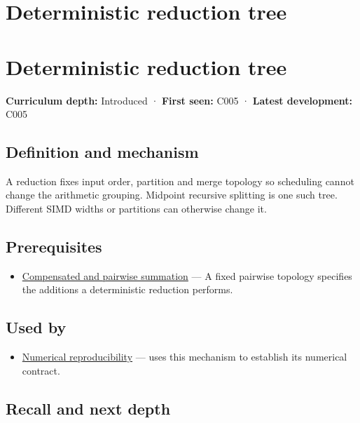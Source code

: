 \hypertarget{appendix-4c8e0238e7ee}{}
\section*{Deterministic reduction tree}
\section{Deterministic reduction tree}\label{deterministic-reduction-tree}

\textbf{Curriculum depth:} Introduced · \textbf{First seen:} C005 · \textbf{Latest development:} C005

\subsection{Definition and mechanism}\label{definition-and-mechanism}

A reduction fixes input order, partition and merge topology so scheduling cannot change the arithmetic grouping. Midpoint recursive splitting is one such tree. Different SIMD widths or partitions can otherwise change it.

\subsection{Prerequisites}\label{prerequisites}

\begin{itemize}
\tightlist
\item
  \hyperref[appendix-df318da57389]{Compensated and pairwise summation} --- A fixed pairwise topology specifies the additions a deterministic reduction performs.
\end{itemize}

\subsection{Used by}\label{used-by}

\begin{itemize}
\tightlist
\item
  \hyperref[appendix-5f1a2c3f97ff]{Numerical reproducibility} --- uses this mechanism to establish its numerical contract.
\end{itemize}

\subsection{Recall and next depth}\label{recall-and-next-depth}

